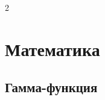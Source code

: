 \documentclass[landscape]{article}
\begin{document}
\begin{multicols*}{2}
\section{Математика}

%
%
%
%
%
%
%
%

\subsection{Гамма-функция}
\label{sec:math:gamma}


\end{multicols*}
\end{document}
